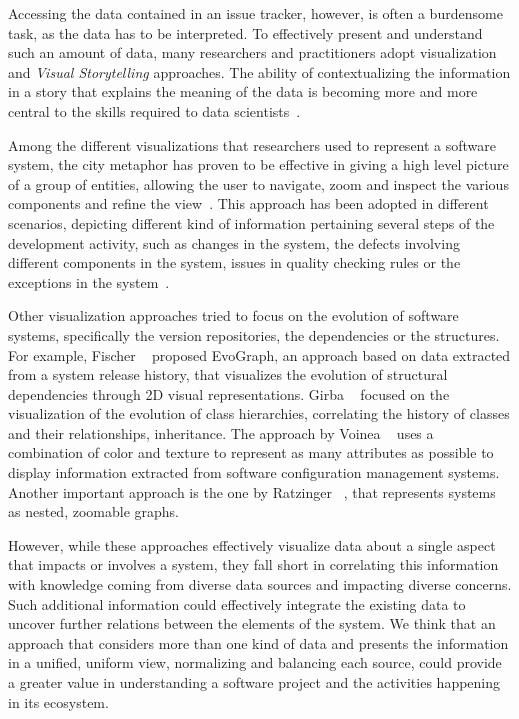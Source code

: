 Accessing the data contained in an issue tracker, however, is often a burdensome task, as the data has to be interpreted.
To effectively present and understand such an amount of data, many researchers and practitioners adopt visualization and \emph{Visual Storytelling} approaches.
The ability of contextualizing the information in a story that explains the meaning of the data is becoming more and more central to the skills required to data scientists~\cite{Segel2010a}.

Among the different visualizations that researchers used to represent a software system, the city metaphor has proven to be effective in giving a high level picture of a group of entities, allowing the user to navigate, zoom and inspect the various components and refine the view~\cite{Wett2011a}.
This approach has been adopted in different scenarios, depicting different kind of information pertaining several steps of the development activity, such as changes in the system, the defects involving different components in the system, issues in quality checking rules or the exceptions in the system~\cite{Panas2003a}.

Other visualization approaches tried to focus on the evolution of software systems, specifically the version repositories, the dependencies or the structures.
For example, Fischer \etal~\cite{Fisch2006a} proposed EvoGraph, an approach based on data extracted from a system release history, that visualizes the evolution of structural dependencies through 2D visual representations.
Girba \etal~\cite{Girb2005a} focused on the visualization of the evolution of class hierarchies, correlating the history of classes and their relationships, \eg inheritance.
The approach by Voinea \etal~\cite{Voin2007a} uses a combination of color and texture to represent as many attributes as possible to display information extracted from software configuration management systems.
Another important approach is the one by Ratzinger \etal~\cite{Ratz2005a}, that represents systems as nested, zoomable graphs.

However, while these approaches effectively visualize data about a single aspect that impacts or involves a system, they fall short in correlating this information with knowledge coming from diverse data sources and impacting diverse concerns.
Such additional information could effectively integrate the existing data to uncover further relations between the elements of the system.
We think that an approach that considers more than one kind of data and presents the information in a unified, uniform view, normalizing and balancing each source, could provide a greater value in understanding a software project and the activities happening in its ecosystem.



